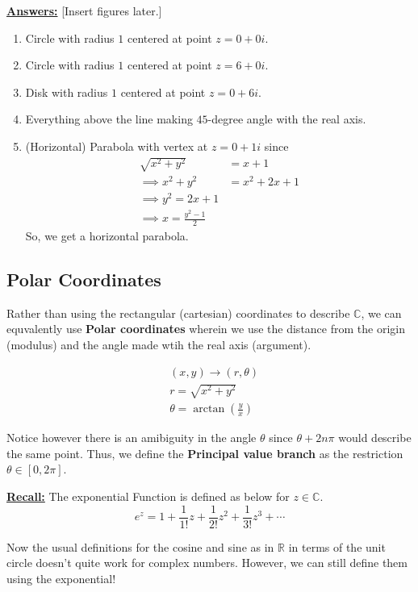 \documentclass{article}
\newcommand{\R}{\mathbb{R}}
\newcommand{\C}{\mathbb{C}}
\begin{document}
\vskip 0.5cm
\underline{\textbf{Answers:}} [Insert figures later.]
\begin{enumerate}
  \item Circle with radius $1$ centered at point $z = 0 + 0i$.
  \item Circle with radius $1$ centered at point $z = 6 + 0i$.
  \item Disk with radius $1$ centered at point $z = 0 + 6i$.
  \item Everything above the line making $45$-degree angle with the real axis.
  \item (Horizontal) Parabola with vertex at $z = 0 + 1i$ since 
  \begin{align*}
    \sqrt{x^2 + y^2} &= x + 1 \\ 
    \implies x^2 + y^2 &= x^2 + 2x + 1 \\
    \implies y^2 = 2x + 1 \\
    \implies x = \frac{y^2 - 1}{2}
  \end{align*}
  So, we get a horizontal parabola.
\end{enumerate}

\vskip 0.5cm
\subsection{Polar Coordinates}
Rather than using the rectangular (cartesian) coordinates to describe $\C$, we can equvalently use \textbf{Polar coordinates} wherein we use the distance from the origin (modulus) and the angle made wtih the real axis (argument).

\begin{align*}
  &(x, y) \rightarrow (r, \theta) \\
  &r = \sqrt{x^2 + y^2} \\
  &\theta = \arctan\left(\frac{y}{x}\right)
\end{align*}

Notice however there is an amibiguity in the angle $\theta$ since $\theta + 2n\pi$ would describe the same point. Thus, we define the \textbf{Principal value branch} as the restriction $\theta \in [0, 2\pi]$.

\vskip 0.5cm
\underline{\textbf{Recall:}} The exponential Function is defined as below for $z \in \C$.
\[ e^z = 1 + \frac{1}{1!} z + \frac{1}{2!} z^2 + \frac{1}{3!} z^3 + \cdots \]

\vskip 0.5cm
Now the usual definitions for the cosine and sine as in $\R$ in terms of the unit circle doesn't quite work for complex numbers. However, we can still define them using the exponential!
\end{document}
